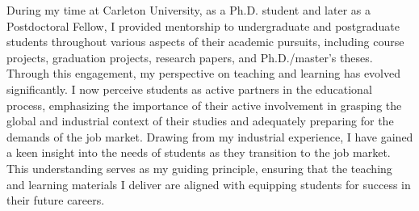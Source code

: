 \documentclass[11pt]{article}
\begin{document}


\newpage

During my time at Carleton University, as a Ph.D. student and later as a Postdoctoral Fellow, I provided mentorship to undergraduate and postgraduate students throughout various aspects of their academic pursuits, including course projects, graduation projects, research papers, and Ph.D./master's theses. Through this engagement, my perspective on teaching and learning has evolved significantly. I now perceive students as active partners in the educational process, emphasizing the importance of their active involvement in grasping the global and industrial context of their studies and adequately preparing for the demands of the job market.
Drawing from my industrial experience, I have gained a keen insight into the needs of students as they transition to the job market. This understanding serves as my guiding principle, ensuring that the teaching and learning materials I deliver are aligned with equipping students for success in their future careers.


\end{document}
